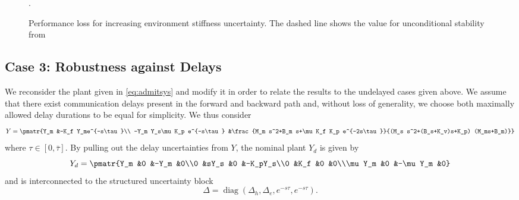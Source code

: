 \begin{figure}\centering%
\caption{Performance loss for increasing environment stiffness uncertainty. The dashed line shows the value for unconditional stability from }.%
\label{fig:increasingKe}%
\end{figure}


\subsection{Case 3: Robustness against Delays}\label{sec:numcase3}


We reconsider the plant given in \eqref{eq:admitsys} and modify it in order to relate the results to the undelayed cases given above. We assume that there exist communication delays present in the forward and backward path and, without loss of generality, we choose both maximally allowed delay durations to be equal for simplicity. We thus consider
\begin{equation*}
Y= \pmatr{Y_m  &-K_f Y_me^{-s\tau}\\ -Y_m Y_s\mu K_p e^{-s\tau} &\frac{M_m s^2+B_m s+\mu K_f K_p e^{-2s\tau}}{(M_s s^2+(B_s+K_v)s+K_p) (M_ms+B_m)}}
\end{equation*}
where $\tau\in[0,\bar{\tau}]$. By pulling out the delay uncertainties from $Y$, the nominal plant $Y_d$ is given by
\begin{equation*}\arraycolsep0.2ex
Y_d  = \pmatr{Y_m &0 &-Y_m &0\\0 &sY_s &0 &-K_pY_s\\0 &K_f &0 &0\\\mu Y_m &0 &-\mu Y_m &0}
\end{equation*}
and is interconnected to the structured uncertainty block
\[
\Delta = \operatorname{diag}\left(\Delta_h,\Delta_e,e^{-s\tau},e^{-s\tau}\right).
\]

